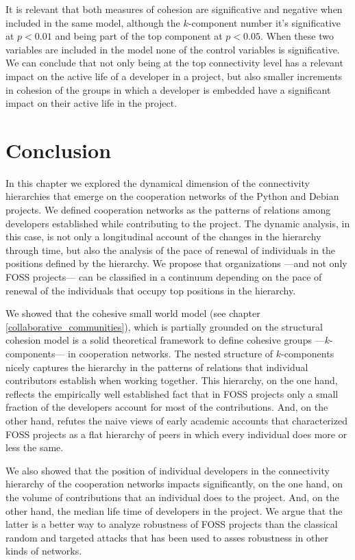 It is relevant that both measures of cohesion are significative and negative when included in the same model, although the $k$-component number it's significative at $p < 0.01$ and being part of the top component at $p < 0.05$. When these two variables are included in the model none of the control variables is significative. We can conclude that not only being at the top connectivity level has a relevant impact on the active life of a developer in a project, but also smaller increments in cohesion of the groups in which a developer is embedded have a significant impact on their active life in the project.

\section{Conclusion}

In this chapter we explored the dynamical dimension of the connectivity hierarchies that emerge on the cooperation networks of the Python and Debian projects. We defined cooperation networks as the patterns of relations among developers established while contributing to the project. The dynamic analysis, in this case, is not only a longitudinal account of the changes in the hierarchy through time, but also the analysis of the pace of renewal of individuals in the positions defined by the hierarchy. We propose that organizations ---and not only FOSS projects--- can be classified in a continuum depending on the pace of renewal of the individuals that occupy top positions in the hierarchy.

We showed that the cohesive small world model (see chapter \ref{collaborative_communities}), which is partially grounded on the structural cohesion model \citep{white:2001, moody:2003} is a solid theoretical framework to define cohesive groups ---$k$-components--- in cooperation networks. The nested structure of $k$-components nicely captures the hierarchy in the patterns of relations that individual contributors establish when working together. This hierarchy, on the one hand, reflects the empirically well established fact that in FOSS projects only a small fraction of the developers account for most of the contributions. And, on the other hand, refutes the naive views of early academic accounts that characterized FOSS projects as a flat hierarchy of peers in which every individual does more or less the same.

We also showed that the position of individual developers in the connectivity hierarchy of the cooperation networks impacts significantly, on the one hand, on the volume of contributions that an individual does to the project. And, on the other hand, the median life time of developers in the project. We argue that the latter is a better way to analyze robustness of FOSS projects than the classical random and targeted attacks that has been used to asses robustness in other kinds of networks.

